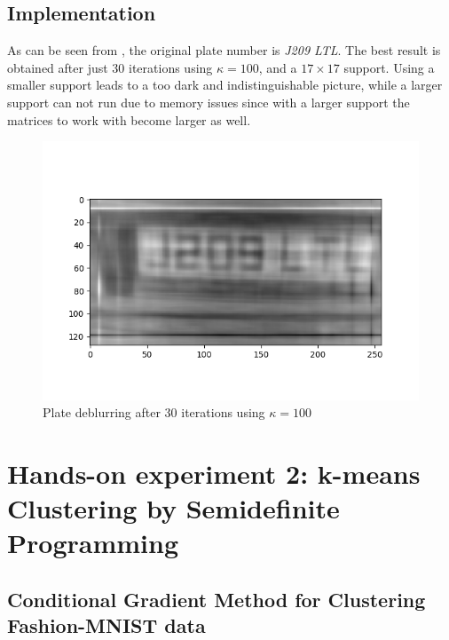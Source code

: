 \documentclass[12pt]{article}
\begin{document}
\subsection{Implementation}
As can be seen from , the original plate number is \textit{J209 LTL}. The best result is obtained after just 30 iterations using $\kappa = 100$, and a $17 \times 17$ support. Using a smaller support leads to a too dark and indistinguishable picture, while a larger support can not run due to memory issues since with a larger support the matrices to work with become larger as well.

\begin{figure}[ht]
    \centering
    \includegraphics[width=17cm]{hw4/code/part2/results/100_30iters.png}
    \caption{Plate deblurring after 30 iterations using $\kappa = 100$}
    \label{fig:plate}
\end{figure}

\section{Hands-on experiment 2: k-means Clustering by Semidefinite Programming}

\subsection{Conditional Gradient Method for Clustering Fashion-MNIST data}
\end{document}
